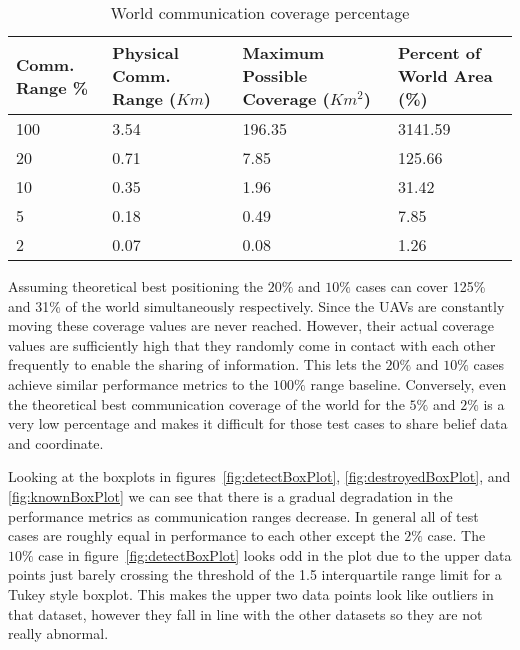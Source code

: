 \begin{multicols*}{2}
\begin{table}[H]
	\caption{World communication coverage percentage}
	\centering
	\label{tab:worldCommsRngCoverage}
	\begin{tabular}{|p{1.25cm}|p{1.5cm}|p{1.75cm}|p{1.5cm}|}
		\hline
		Comm. Range \% & Physical Comm. Range ($Km$) &  Maximum Possible Coverage ($Km^{2}$) & Percent of World Area (\%)\\
		\hline
		100 & 3.54 & 196.35 & 3141.59 \\ \hline
		20  & 0.71 & 7.85   & 125.66  \\ \hline
		10  & 0.35 & 1.96   & 31.42   \\ \hline
		5   & 0.18 & 0.49   & 7.85    \\ \hline
		2   & 0.07 & 0.08   & 1.26    \\ \hline
	\end{tabular}
\end{table} 

Assuming theoretical best positioning the $20\%$ and $10\%$ cases can cover 125\% and 31\% of the world simultaneously respectively. Since the UAVs are constantly moving these coverage values are never reached.  However, their actual coverage values are sufficiently high that they randomly come in contact with each other frequently to enable the sharing of information.  This lets the $20\%$ and $10\%$ cases achieve similar performance metrics to the $100\%$ range baseline.  Conversely, even the theoretical best communication coverage of the world for the $5\%$ and $2\%$ is a very low percentage and makes it difficult for those test cases to share belief data and coordinate.

Looking at the boxplots in figures~\ref{fig:detectBoxPlot}, \ref{fig:destroyedBoxPlot}, and \ref{fig:knownBoxPlot} we can see that there is a gradual degradation in the performance metrics as communication ranges decrease.  In general all of test cases are roughly equal in performance to each other except the $2\%$ case.  The $10\%$ case in figure~\ref{fig:detectBoxPlot} looks odd in the plot due to the upper data points just barely crossing the threshold of the 1.5 interquartile range limit for a Tukey style boxplot.  This makes the upper two data points look like outliers in that dataset, however they fall in line  with the other datasets so they are not really abnormal. 


\end{multicols*}
